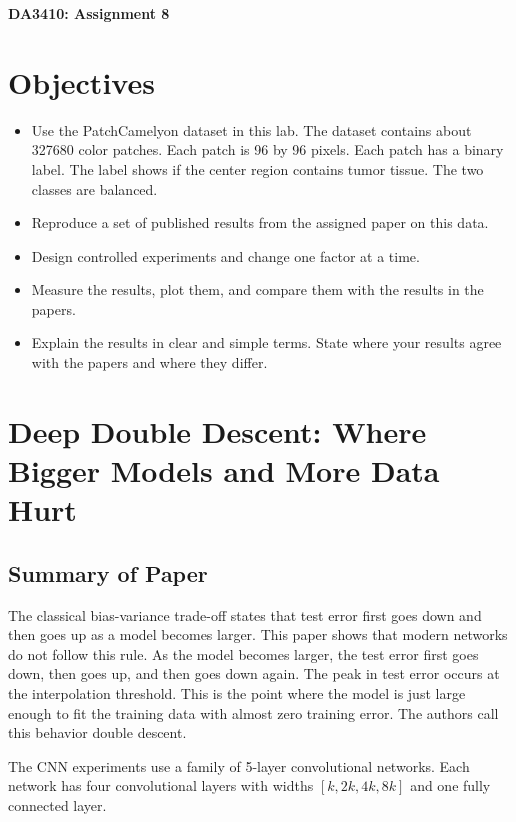 \documentclass[11pt]{article}
\newcommand{\assignmentnumber}{8}
\begin{document}
\begin{center}
    {\Large \textbf{DA3410: Assignment \assignmentnumber}}
\end{center}


\section{Objectives}
\label{sec:objectives}
 
\begin{itemize}
  \item Use the PatchCamelyon dataset in this lab. The dataset contains about
        327680 color patches. Each patch is 96 by 96 pixels. Each patch has a
        binary label. The label shows if the center region contains tumor tissue.
        The two classes are balanced.
  \item Reproduce a set of published results from the assigned paper on this data.
  \item Design controlled experiments and change one factor at a time.
  \item Measure the results, plot them, and compare them with the results in the
        papers.
  \item Explain the results in clear and simple terms. State where your results
        agree with the papers and where they differ.
\end{itemize}



\section{Deep Double Descent: Where Bigger Models and More Data Hurt}
\label{sec:double-descent}

\subsection*{Summary of Paper}
The classical bias-variance trade-off states that test error first goes down and
then goes up as a model becomes larger. This paper shows that modern networks do
not follow this rule. As the model becomes larger, the test error first goes down,
then goes up, and then goes down again. The peak in test error occurs at the
interpolation threshold. This is the point where the model is just large enough to
fit the training data with almost zero training error. The authors call this
behavior double descent.

The CNN experiments use a family of 5-layer convolutional networks. Each
network has four convolutional layers with widths $[k, 2k, 4k, 8k]$ and one fully
connected layer.
\end{document}

